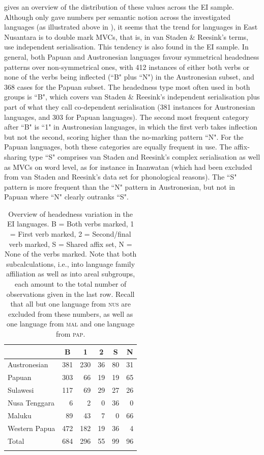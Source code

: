  gives an overview of the distribution of these values across the EI sample. Although \citet{vanstaden2008serial} only gave numbers per semantic notion across the investigated languages (as illustrated above in ), it seems that the trend for languages in East Nusantara is to double mark MVCs, that is, in van Staden \& Reesink's terms, use independent serialisation. This tendency is also found in the EI sample. In general, both Papuan and Austronesian languages favour symmetrical headedness patterns over non-symmetrical ones, with 412 instances of either both verbs or none of the verbs being inflected (``B" plus ``N") in the Austronesian subset, and 368 cases for the Papuan subset. The headedness type most often used in both groups is ``B", which covers van Staden \& Reesink's independent serialisation plus part of what they call co-dependent serialisation (381 instances for Austronesian languages, and 303 for Papuan languages). The second most frequent category after ``B" is ``1" in Austronesian languages, in which the first verb takes inflection but not the second, scoring higher than the no-marking pattern ``N". For the Papuan languages, both these categories are equally frequent in use. The affix-sharing type ``S" comprises van Staden and Reesink's complex serialisation as well as MVCs on word level, as for instance in Inanwatan (which had been excluded from van Staden and Reesink's data set for phonological reasons). The ``S" pattern is more frequent than the ``N" pattern in Austronesian, but not in Papuan where ``N" clearly outranks ``S".

\begin{table}
\begin{tabular}{lrrrrr}
  \lsptoprule
& \multicolumn{1}{c}{B} & \multicolumn{1}{c}{1} & \multicolumn{1}{c}{2} & \multicolumn{1}{c}{S} & \multicolumn{1}{c}{N} \tabularnewline 
  \midrule
  Austronesian & 381 & 230 &  36 &  80 & 31 \tabularnewline
  Papuan & 303 & 66 &  19 &  19 & 65 \tabularnewline
   \midrule
  Sulawesi & 117 &  69 &  29 &  27 &  26 \tabularnewline
  Nusa Tenggara & 6 & 2 &  0 &  36 & 0 \tabularnewline
  Maluku & 89 &  43 &   7 &   0 &   66 \tabularnewline 
  Western Papua & 472 & 182 &  19 &  36 &  4 \tabularnewline 
\midrule
Total & 684 & 296 & 55 & 99 & 96 \tabularnewline
\lspbottomrule
\end{tabular}
\caption[Headedness variation in the EI sample]{Overview of headedness variation in the EI languages. B = Both verbs marked, 1 = First verb marked, 2 = Second/final verb marked, S = Shared affix set, N = None of the verbs marked. Note that both subcalculations, i.e., into language family affiliation as well as into areal subgroups, each amount to the total number of observations given in the last row. Recall that all but one language from \textsc{nus} are excluded from these numbers, as well as one language from \textsc{mal} and one language from \textsc{pap}.}
\label{table:Headedness_overview}
\end{table}

